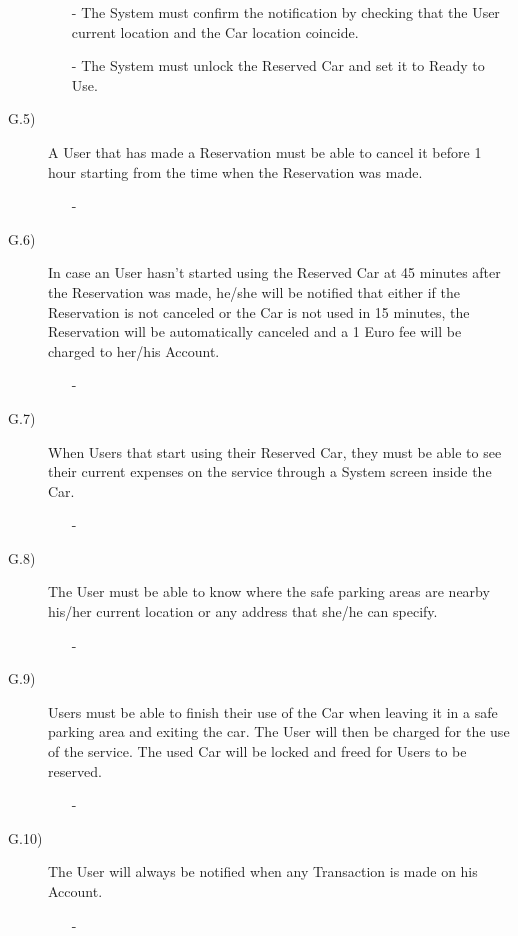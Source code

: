 \documentclass[a4paper]{article}
\begin{document}
\begin{description}
\begin{itemize}
	\item[-]The System must confirm the notification by checking that the User current location and the Car location coincide.
	\item[-]The System must unlock the Reserved Car and set it to Ready to Use.
\end{itemize}
\item [G.5)]A User that has made a Reservation must be able to cancel it before 1 hour starting from the time when the Reservation was made.
\begin{itemize}
	\item[-]
\end{itemize}
\item [G.6)]In case an User hasn't started using the Reserved Car at 45 minutes after the Reservation was made, he/she will be notified that either if the Reservation is not canceled or the Car is not used in 15 minutes, the Reservation will be automatically canceled and a 1 Euro fee will be charged to her/his Account.
\begin{itemize}
	\item[-]
\end{itemize}
\item [G.7)]When Users that start using their Reserved Car, they must be able to see their current expenses on the service through a System screen inside the Car.
\begin{itemize}
	\item[-]
\end{itemize}
\item [G.8)]The User must be able to know where the safe parking areas are nearby his/her current location or any address that she/he can specify.
\begin{itemize}
	\item[-]
\end{itemize}
\item [G.9)]Users must be able to finish their use of the Car when leaving it in a safe parking area and exiting the car. The User will then be charged for the use of the service. The used Car will be locked and freed for Users to be reserved.
\begin{itemize}
	\item[-]
\end{itemize}
\item [G.10)]The User will always be notified when any Transaction is made on his Account.
\begin{itemize}
	\item[-]
\end{itemize}

\end{description}
\end{document}
